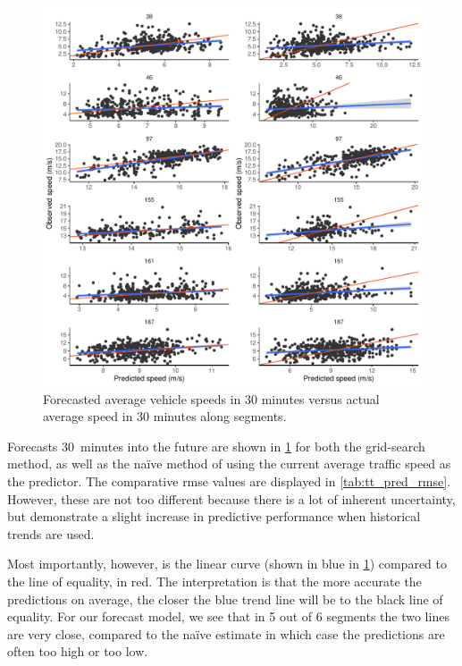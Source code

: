 \begin{knitrout}\small
{}\color{fgcolor}\begin{figure}

{\centering \includegraphics[width=\linewidth]{figure/tt_week1_pred-1} 

}

\caption[Forecasted average vehicle speeds in 30 minutes versus actual average speed in 30 minutes along segments]{Forecasted average vehicle speeds in 30 minutes versus actual average speed in 30 minutes along segments.}\label{fig:tt_week1_pred}
\end{figure}


\end{knitrout}


Forecasts 30~minutes into the future are shown in \cref{fig:tt_week1_pred} for both the grid-search method, as well as the na\"ive method of using the current average traffic speed as the predictor. The comparative \gls{rmse} values are displayed in \cref{tab:tt_pred_rmse}. However, these are not too different because there is a lot of inherent uncertainty, but demonstrate a slight increase in predictive performance when historical trends are used.


Most importantly, however, is the linear curve (shown in blue in \cref{fig:tt_week1_pred}) compared to the line of equality, in red. The interpretation is that the more accurate the predictions on average, the closer the blue trend line will be to the black line of equality. For our forecast model, we see that in 5 out of 6 segments the two lines are very close, compared to the na\"ive estimate in which case the predictions are often too high or too low.


